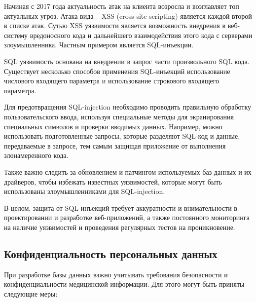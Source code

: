 Начиная с 2017 года актуальность атак на клиента возросла и возглавляет топ актуальных угроз. Атака вида – XSS (cross-site scripting) является каждой второй в списке атак. Сутью XSS уязвимости является возможность внедрения в веб-систему вредоносного кода и дальнейшего взаимодействия этого кода с серверами злоумышленника. Частным примером является SQL-инъекции.

SQL уязвимость основана на внедрении в запрос части произвольного SQL кода. Существует несколько способов применения SQL-инъекций использование числового входящего параметра и использование строкового входящего параметра.

Для предотвращения SQL-injection необходимо проводить правильную обработку пользовательского ввода, используя специальные методы для экранирования специальных символов и проверки вводимых данных. Например, можно использовать подготовленные запросы, которые разделяют SQL-код и данные, передаваемые в запросе, тем самым защищая приложение от выполнения злонамеренного кода.

Также важно следить за обновлением и патчингом используемых баз данных и их драйверов, чтобы избежать известных уязвимостей, которые могут быть использованы злоумышленниками для SQL-injection.

В целом, защита от SQL-инъекций требует аккуратности и внимательности в проектировании и разработке веб-приложений, а также постоянного мониторинга на наличие уязвимостей и проведения регулярных тестов на проникновение.




\subsection{Конфиденциальность персональных данных}

При разработке базы данных важно учитывать требования безопасности и конфиденциальности медицинской информации. Для этого могут быть приняты следующие меры:

